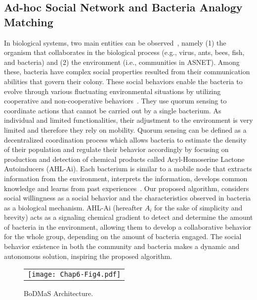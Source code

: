 \subsection{Ad-hoc Social Network and Bacteria Analogy Matching}\label{Chap6_03_04}
In biological systems, two main entities can be observed~\cite{JLFernandez-Marquez2013}, namely (1) the organism that collaborates in the biological process (e.g., virus, ants, bees, fish, and bacteria) and (2) the environment (i.e., communities in ASNET). Among these, bacteria have complex social properties resulted from their communication abilities that govern their colony. These social behaviors enable the bacteria to evolve through various fluctuating environmental situations by utilizing cooperative and non-cooperative behaviors~\cite{MHasan2014}. They use quorum sensing to coordinate actions that cannot be carried out by a single bacterium. As individual and limited functionalities, their adjustment to the environment is very limited and therefore they rely on mobility. Quorum sensing can be defined as a decentralized coordination process which allows bacteria to estimate the density of their population and regulate their behavior accordingly by focusing on production and detection of chemical products called Acyl-Homoserine Lactone Autoinducers (AHL-Ai). Each bacterium is similar to a mobile node that extracts information from the environment, interprets the information, develops common knowledge and learns from past experiences~\cite{AEinolghozati2012}. Our proposed algorithm, considers social willingness as a social behavior and the characteristics observed in bacteria as a biological mechanism. AHL-Ai (hereafter $A_i$ for the sake of simplicity and brevity) acts as a signaling chemical gradient to detect and determine the amount of bacteria in the environment, allowing them to develop a collaborative behavior for the whole group, depending on the amount of bacteria engaged. The social behavior existence in both the community and bacteria makes a dynamic and autonomous solution, inspiring the proposed algorithm.
\begin{figure}[t]
\begin{center}
  \begin{tabular}{c}
  \texttt{[image: Chap6-Fig4.pdf]}
  \end{tabular}
  \caption{BoDMaS Architecture.}
\end{center}
\end{figure}

